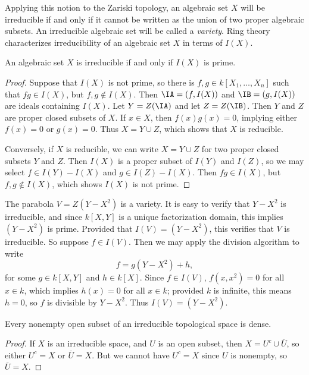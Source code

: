 Applying this notion to the Zariski topology, an algebraic set $X$ will be irreducible if and only if it cannot be written as the union of two proper algebraic subsets. An irreducible algebraic set will be called a \emph{variety}. Ring theory characterizes irreducibility of an algebraic set $X$ in terms of $I(X)$.

\begin{prop}
    An algebraic set $X$ is irreducible if and only if $I(X)$ is prime.
\end{prop}
\begin{proof}
    Suppose that $I(X)$ is not prime, so there is $f,g \in k[X_1,\dots,X_n]$ such that $fg \in I(X)$, but $f,g \not \in I(X)$. Then $\IA = (f,I(X))$ and $\IB = (g,I(X))$ are ideals containing $I(X)$. Let $Y = Z(\IA)$ and let $Z = Z(\IB)$. Then $Y$ and $Z$ are proper closed subsets of $X$. If $x \in X$, then $f(x) g(x) = 0$, implying either $f(x) = 0$ or $g(x) = 0$. Thus $X = Y \cup Z$, which shows that $X$ is reducible.

    Conversely, if $X$ is reducible, we can write $X = Y \cup Z$ for two proper closed subsets $Y$ and $Z$. Then $I(X)$ is a proper subset of $I(Y)$ and $I(Z)$, so we may select $f \in I(Y) - I(X)$ and $g \in I(Z) - I(X)$. Then $fg \in I(X)$, but $f,g \not \in I(X)$, which shows $I(X)$ is not prime.
\end{proof}

\begin{example}
    The parabola $V = Z(Y - X^2)$ is a variety. It is easy to verify that $Y - X^2$ is irreducible, and since $k[X,Y]$ is a unique factorization domain, this implies $(Y - X^2)$ is prime. Provided that $I(V) = (Y - X^2)$, this verifies that $V$ is irreducible. So suppose $f \in I(V)$. Then we may apply the division algorithm to write
    \[ f = g (Y - X^2) + h, \]
    for some $g \in k[X,Y]$ and $h \in k[X]$. Since $f \in I(V)$, $f(x,x^2) = 0$ for all $x \in k$, which implies $h(x) = 0$ for all $x \in k$; provided $k$ is infinite, this means $h = 0$, so $f$ is divisible by $Y - X^2$. Thus $I(V) = (Y - X^2)$.
\end{example}

\begin{theorem}
    Every nonempty open subset of an irreducible topological space is dense.
\end{theorem}
\begin{proof}
    If $X$ is an irreducible space, and $U$ is an open subset, then $X = U^c \cup \overline{U}$, so either $U^c = X$ or $\overline{U} = X$. But we cannot have $U^c = X$ since $U$ is nonempty, so $\overline{U} = X$.
\end{proof}

